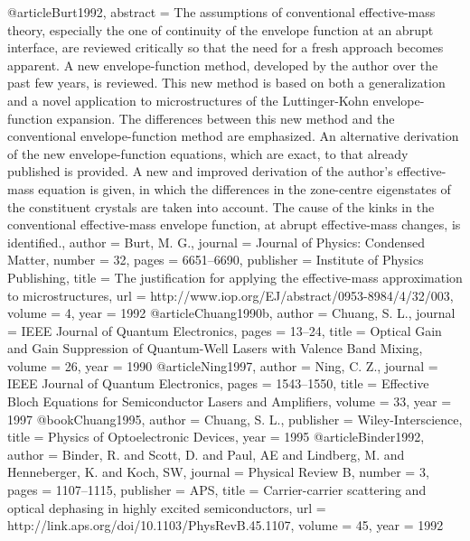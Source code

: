 @article{Burt1992,
abstract = {The assumptions of conventional effective-mass theory, especially the one of continuity of the envelope function at an abrupt interface, are reviewed critically so that the need for a fresh approach becomes apparent. A new envelope-function method, developed by the author over the past few years, is reviewed. This new method is based on both a generalization and a novel application to microstructures of the Luttinger-Kohn envelope-function expansion. The differences between this new method and the conventional envelope-function method are emphasized. An alternative derivation of the new envelope-function equations, which are exact, to that already published is provided. A new and improved derivation of the author's effective-mass equation is given, in which the differences in the zone-centre eigenstates of the constituent crystals are taken into account. The cause of the kinks in the conventional effective-mass envelope function, at abrupt effective-mass changes, is identified.},
author = {Burt, M. G.},
journal = {Journal of Physics: Condensed Matter},
number = {32},
pages = {6651--6690},
publisher = {Institute of Physics Publishing},
title = {{The justification for applying the effective-mass approximation to microstructures}},
url = {http://www.iop.org/EJ/abstract/0953-8984/4/32/003},
volume = {4},
year = {1992}
}
@article{Chuang1990b,
author = {Chuang, S. L.},
journal = {IEEE Journal of Quantum Electronics},
pages = {13--24},
title = {{Optical Gain and Gain Suppression of Quantum-Well Lasers with Valence Band Mixing}},
volume = {26},
year = {1990}
}
@article{Ning1997,
author = {Ning, C. Z.},
journal = {IEEE Journal of Quantum Electronics},
pages = {1543--1550},
title = {{Effective Bloch Equations for Semiconductor Lasers and Amplifiers}},
volume = {33},
year = {1997}
}
@book{Chuang1995,
author = {Chuang, S. L.},
publisher = {Wiley-Interscience},
title = {{Physics of Optoelectronic Devices}},
year = {1995}
}
@article{Binder1992,
author = {Binder, R. and Scott, D. and Paul, AE and Lindberg, M. and Henneberger, K. and Koch, SW},
journal = {Physical Review B},
number = {3},
pages = {1107--1115},
publisher = {APS},
title = {{Carrier-carrier scattering and optical dephasing in highly excited semiconductors}},
url = {http://link.aps.org/doi/10.1103/PhysRevB.45.1107},
volume = {45},
year = {1992}
}
